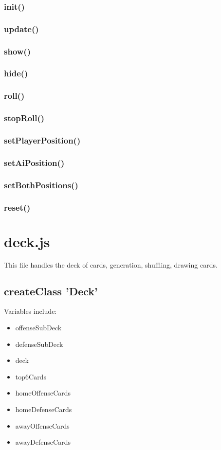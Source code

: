 \documentclass[12pt]{article}
\begin{document}
\subsubsection*{init()}
\subsubsection*{update()}
\subsubsection*{show()}
\subsubsection*{hide()}
\subsubsection*{roll()}
\subsubsection*{stopRoll()}
\subsubsection*{setPlayerPosition()}
\subsubsection*{setAiPosition()}
\subsubsection*{setBothPositions()}
\subsubsection*{reset()}

\section*{deck.js}
This file handles the deck of cards, generation, shuffling, drawing
cards. 
\subsection*{createClass 'Deck'}
Variables include:
\begin{itemize}
\item offenseSubDeck
\item defenseSubDeck
\item deck
\item top6Cards
\item homeOffenseCards
\item homeDefenseCards
\item awayOffenseCards
\item awayDefenseCards
\end{itemize}
\end{document}
